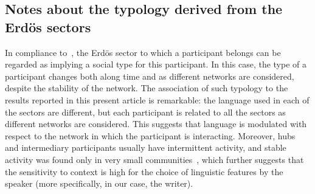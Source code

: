 \documentclass[review]{elsarticle}
\begin{document}
\subsection{Notes about the typology derived from the Erd\"os sectors}
In compliance to~\cite{stab}, the Erd\"os sector to which a participant belongs can be regarded as implying a social type for this participant.
In this case, the type of a participant changes both along time and as different networks are considered,
despite the stability of the network.
The association of such typology to the results reported in this present article is remarkable:
the language used in each of the sectors are different,
but each participant is related to all the sectors
as different networks are considered.
This suggests that language is modulated with respect to the network in which the participant
is interacting.
Moreover, hubs and intermediary participants usually have intermittent activity,
and stable activity was found only in very small communities~\cite{barabasiEvo},
which further suggests that the sensitivity to context is high for the choice of
linguistic features by the speaker (more specifically, in our case, the writer).
\end{document}
